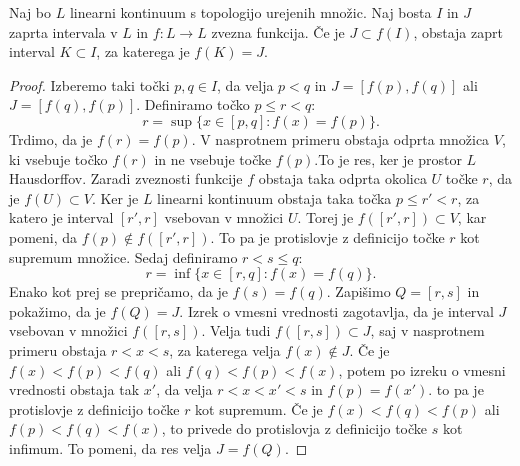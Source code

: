 \documentclass[mat2]{fmfdelo}
\begin{document}
\begin{lema}
Naj bo $L$ linearni kontinuum s topologijo urejenih množic. Naj bosta $I$ in $J$ zaprta intervala v $L$ in $f:L \to L$ zvezna funkcija. Če je $J \subset f(I)$, obstaja zaprt interval $K \subset I$, za katerega je $f(K) = J$.
\end{lema}
\begin{proof}
Izberemo taki točki $p, q \in I$, da velja $p<q$ in $J=[f(p), f(q)]$ ali $J=[f(q), f(p)]$. Definiramo točko $p \leq r < q$:
$$r= \sup\{x \in [p, q] : f(x) = f(p)\}.$$
Trdimo, da je $f(r) = f(p)$. V nasprotnem primeru obstaja odprta množica $V$, ki vsebuje točko $f(r)$ in ne vsebuje točke $f(p)$.To je res, ker je prostor $L$ Hausdorffov. Zaradi zveznosti funkcije $f$ obstaja taka odprta okolica $U$ točke $r$, da je $f(U) \subset V$. Ker je $L$ linearni kontinuum obstaja taka točka $p \leq r' < r$, za katero je interval $[r', r]$ vsebovan v množici $U$. Torej je $f([r', r]) \subset V$, kar pomeni, da $f(p) \notin f([r', r])$. To pa je protislovje z definicijo točke $r$ kot supremum množice.
Sedaj definiramo $r<s \leq q$:
$$r= \inf\{x \in [r, q] : f(x) = f(q)\}.$$ 
Enako kot prej se prepričamo, da je $f(s) = f(q)$. Zapišimo $Q = [r, s]$ in pokažimo, da je $f(Q) = J$. Izrek o vmesni vrednosti zagotavlja, da je interval $J$ vsebovan v množici $f([r, s])$. Velja tudi $f([r, s]) \subset J$, saj v nasprotnem primeru obstaja $r<x<s$, za katerega velja $f(x) \notin J$. Če je $f(x) < f(p) < f(q)$ ali $f(q) < f(p) < f(x)$, potem po izreku o vmesni vrednosti obstaja tak $x'$, da velja $r<x<x'<s$ in $f(p) = f(x')$. to pa je protislovje z definicijo točke $r$ kot supremum. Če je $f(x) < f(q) < f(p)$ ali $f(p) < f(q) < f(x)$, to privede do protislovja z definicijo točke $s$ kot infimum. To pomeni, da res velja $J = f(Q)$.
\end{proof}
\end{document}
